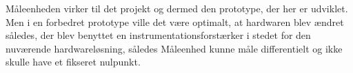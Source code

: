 
Måleenheden virker til det projekt og dermed den prototype, der her er udviklet. Men i en forbedret prototype ville det være optimalt, at hardwaren blev ændret således, der blev benyttet en instrumentationsforstærker i stedet for den nuværende hardwareløsning, således Måleenhed kunne måle differentielt og ikke skulle have et fikseret nulpunkt.